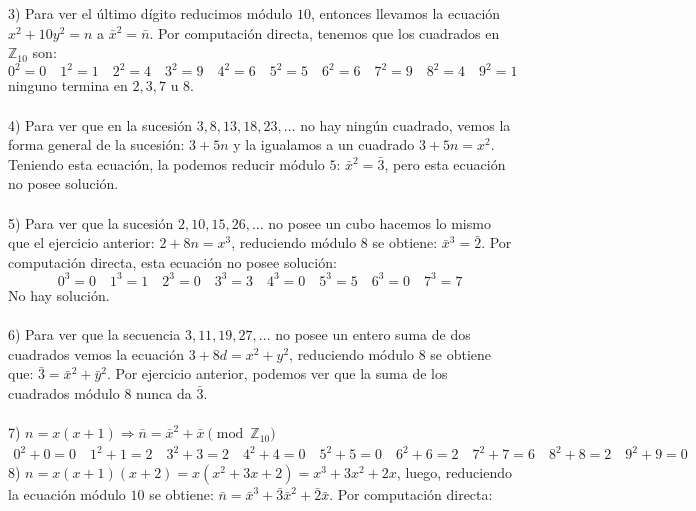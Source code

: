 \documentclass{article}
\begin{document}
\\
\\
3) Para ver el último dígito reducimos módulo $10$, entonces llevamos la ecuación $x^2 +10y^2 = n$ a $\bar{x}^{2}=\bar{n}$. Por computación directa, tenemos que los cuadrados en $\mathbb{Z}_{10}$ son:
\begin{equation*}
    0^{2}=0 \quad 1^{2}=1 \quad 2^{2}=4 \quad 3^{2}=9 \quad 4^{2}=6 \quad 5^{2}=5 \quad 6^{2}=6 \quad 7^{2}=9 \quad 8^{2}=4 \quad 9^{2}=1
\end{equation*}
ninguno termina en $2,3,7$ u $8$.
\\
\\
4) Para ver que en la sucesión $3, 8 , 13, 18,23, \dots$ no hay ningún cuadrado, vemos la forma general de la sucesión: $3+5n$ y la igualamos a un cuadrado $3+5n=x^{2}$. Teniendo esta ecuación, la podemos reducir módulo $5$: $\bar{x}^{2}=\bar{3}$, pero esta ecuación no posee solución.
\\
\\
5) Para ver que la sucesión $2,10,15,26, \dots$ no posee un cubo hacemos lo mismo que el ejercicio anterior: $2+8n=x^3$, reduciendo módulo $8$ se obtiene: $\bar{x}^{3}=\bar{2}$. Por computación directa, esta ecuación no posee solución:
\begin{equation*}
    0^3 = 0 \quad 1^3 = 1 \quad 2^3 = 0 \quad 3^3 = 3 \quad 4^3 = 0 \quad 5^3 = 5 \quad 6^3 = 0 \quad 7^3 = 7
\end{equation*}
No hay solución.
\\
\\
6) Para ver que la secuencia $3,11,19,27,\dots$ no posee un entero suma de dos cuadrados vemos la ecuación $3+8d=x^2 + y^2$, reduciendo módulo $8$ se obtiene que: $\bar{3}=\bar{x}^{2} + \bar{y}^{2}$. Por ejercicio anterior, podemos ver que la suma de los cuadrados módulo $8$ nunca da $\bar{3}$.
\\
\\
7)
$n=x(x+1) \Longrightarrow \bar{n}=\bar{x}^{2}+\bar{x} \pmod{\mathbb{Z}_{10}}$
\begin{equation*}
\begin{aligned}
    0^2+0=0 \quad 1^2+1=2 \quad 3^2+3=2 \quad 4^2+4=0 \quad 5^2+5=0 \quad 6^2+6=2 \quad 7^2+7=6 \quad 8^2+8 = 2 \quad 9^2+9=0
\end{aligned}
\end{equation*}
8)
$n=x(x+1)(x+2)=x(x^2 + 3x +2)=x^3+3x^2+2x$, luego, reduciendo la ecuación módulo $10$ se obtiene: $\bar{n}=\bar{x}^{3} + \bar{3} \bar{x}^{2} + \bar{2}\bar{x}$. Por computación directa:
\end{document}
